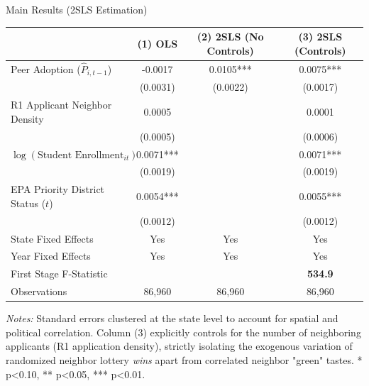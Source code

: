 \documentclass[aspectratio=169]{beamer}
\begin{document}

\begin{frame}[label=main_results]{Main Results (2SLS Estimation)}
    \centering
    \footnotesize
    \begin{tabular}{lccc}
        \toprule
        & \textbf{(1) OLS} & \textbf{(2) 2SLS (No Controls)} & \textbf{(3) 2SLS (Controls)} \\
        \midrule
        Peer Adoption ($\widehat{P}_{i,t-1}$) & -0.0017   & 0.0105*** &  0.0075*** \\
                                        & (0.0031)  & (0.0022)  & (0.0017) \\
        R1 Applicant Neighbor Density   & 0.0005    &           & 0.0001     \\
                                        & (0.0005)  &           & (0.0006) \\        
        $\log(\text{Student Enrollment}_{it})$  & 0.0071*** &           & 0.0071*** \\
                                        & (0.0019)  &           & (0.0019) \\
        EPA Priority District Status ($t$) & 0.0054*** &           & 0.0055*** \\
                                        & (0.0012)  &           & (0.0012) \\
        \midrule
        State Fixed Effects             & Yes       & Yes       & Yes \\
        Year Fixed Effects              & Yes       & Yes       & Yes \\
        First Stage F-Statistic         &           &           & \textbf{534.9} \\
        Observations                    & 86,960    & 86,960    & 86,960 \\
        \bottomrule
    \end{tabular}
    
    \vspace{0.2cm}
    \raggedright
    \scriptsize \textit{Notes:} Standard errors clustered at the state level to account for spatial and political correlation. Column (3) explicitly controls for the number of neighboring applicants (R1 application density), strictly isolating the exogenous variation of randomized neighbor lottery \textit{wins} apart from correlated neighbor "green" tastes. * p<0.10, ** p<0.05, *** p<0.01.
\end{frame}
\end{document}

